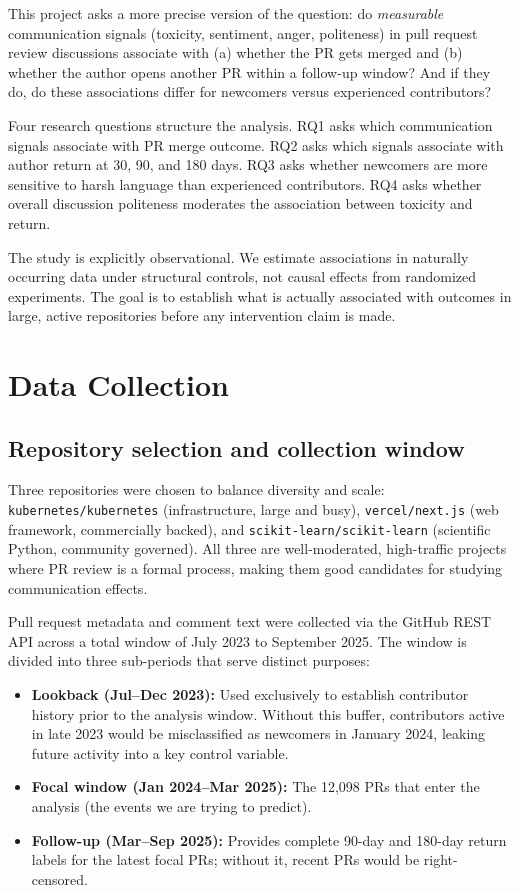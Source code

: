 \documentclass[12pt,a4paper]{article}
\begin{document}
This project asks a more precise version of the question: do \emph{measurable} communication signals (toxicity, sentiment, anger, politeness) in pull request review discussions associate with (a) whether the PR gets merged and (b) whether the author opens another PR within a follow-up window? And if they do, do these associations differ for newcomers versus experienced contributors?

Four research questions structure the analysis. RQ1 asks which communication signals associate with PR merge outcome. RQ2 asks which signals associate with author return at 30, 90, and 180 days. RQ3 asks whether newcomers are more sensitive to harsh language than experienced contributors. RQ4 asks whether overall discussion politeness moderates the association between toxicity and return.

The study is explicitly observational. We estimate associations in naturally occurring data under structural controls, not causal effects from randomized experiments. The goal is to establish what is actually associated with outcomes in large, active repositories before any intervention claim is made.

\section{Data Collection}

\subsection{Repository selection and collection window}

Three repositories were chosen to balance diversity and scale: \texttt{kubernetes/kubernetes} (infrastructure, large and busy), \texttt{vercel/next.js} (web framework, commercially backed), and \texttt{scikit-learn/scikit-learn} (scientific Python, community governed). All three are well-moderated, high-traffic projects where PR review is a formal process, making them good candidates for studying communication effects.

Pull request metadata and comment text were collected via the GitHub REST API across a total window of July 2023 to September 2025. The window is divided into three sub-periods that serve distinct purposes:

\begin{itemize}\setlength\itemsep{2pt}
  \item \textbf{Lookback (Jul--Dec 2023):} Used exclusively to establish contributor history prior to the analysis window. Without this buffer, contributors active in late 2023 would be misclassified as newcomers in January 2024, leaking future activity into a key control variable.
  \item \textbf{Focal window (Jan 2024--Mar 2025):} The 12,098 PRs that enter the analysis (the events we are trying to predict).
  \item \textbf{Follow-up (Mar--Sep 2025):} Provides complete 90-day and 180-day return labels for the latest focal PRs; without it, recent PRs would be right-censored.
\end{itemize}
\end{document}

